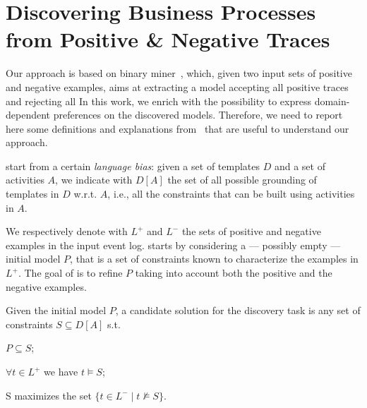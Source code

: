 
\section{Discovering Business Processes from Positive \& Negative Traces}
\label{sec:deviant}




Our approach is based on  \nd binary miner~\cite{deviant-tkde}, which, given two input sets of positive and negative examples, aims at extracting a model accepting all positive traces and rejecting all  %
In this work, we enrich \nd with the possibility to express domain-dependent preferences on the discovered models. Therefore, we need to report here some definitions and explanations from~\cite{deviant-tkde} that are useful to understand %
our approach.

\nd start from a certain \emph{language bias}: given a set of \declare templates $D$ and a set of activities $A$, we indicate with $D[A]$ the set of all possible grounding of templates in $D$ w.r.t. $A$, i.e., all the constraints that can be built using activities in $A$.

We respectively denote with $L^+$ and $L^-$ the sets of positive and negative examples %
in the input event log. \nd starts by considering a --- possibly empty --- initial model $P$, that is a set of \declare constraints known to characterize the examples in $L^+$. The goal of \nd is to refine $P$ taking into account both the positive and the negative examples.

\begin{definition}{}\label{def:cand}
Given the initial model $P$, a candidate solution for the discovery task is any set of constraints $S\subseteq D[A]$ s.t.
\begin{enumerate*} [label=\textit{(\roman*)}]
  \item $P\subseteq S$;
  \item $\forall t\in L^+$ we have $t\models S$;
  \item S maximizes the set $\{t\in L^-\mid t\not\models S\}$.
\end{enumerate*}
\end{definition}

